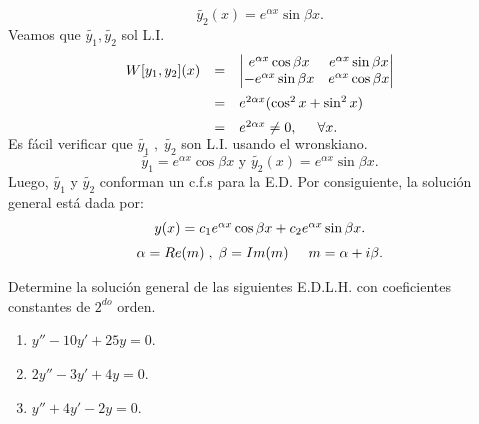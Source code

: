 \documentclass{beamer}
\begin{document}
\begin{frame}[t]
	\begin{block}{}
		\[
			\tilde{y_2} (x) = e^{\alpha x} \sin \beta x.
		\]
		Veamos que \(\tilde{y_1} , \tilde{y_2}\) sol L.I. \vspace{-6mm}
		\[
			\begin{array}{rcl}
				W[y_1,y_2] (x) & = & \begin{vmatrix}
					e^{\alpha x} \cos \beta x & e^{\alpha x} \sin \beta x \\
					-e^{\alpha x} \sin \beta x & e^{\alpha x} \cos \beta x
				\end{vmatrix}\\[4mm]
				& = & e^{2\alpha x} (\cos ^2x+ \sin ^2x) \\[2mm]
				& = & e^{2\alpha x} \ne 0, \hspace{5mm} \forall x. \vspace{-3mm}
			\end{array}
		\]
		Es fácil verificar que \(\tilde{y_1} \;,\; \tilde{y_2}\) son L.I. usando el wronskiano.
		\[
			\tilde{y_1} = e^{\alpha x} \cos \beta x \mbox{  y  } \tilde{y_2} (x) = e^{\alpha x} \sin \beta x.
		\]
		Luego, \(\tilde{y_1}\) y \(\tilde{y_2}\) conforman un c.f.s para la E.D. Por consiguiente, la solución general está dada por:
		\[
			\begin{array}{c}
				y(x) = c_1 e^{\alpha x} \cos \beta x+c_2e^{\alpha x} \sin \beta x. \\[2mm]
				\alpha = Re(m) \;,\; \beta =Im(m) \hspace{5mm} m = \alpha +i \beta .
			\end{array}
		\]
	\end{block}
\end{frame}

\begin{frame}[t]
	\begin{example}
		Determine la solución general de las siguientes E.D.L.H. con coeficientes constantes de \(2^{do}\) orden.
		\begin{enumerate}
			\item \(y'' -10y' +25y=0\).
			\item \(2y'' -3y' +4y=0\).
			\item \(y'' +4y' -2y=0\).
		\end{enumerate}
	\end{example}
\end{frame}
\begin{frame}[t]
\end{frame}
\end{document}
